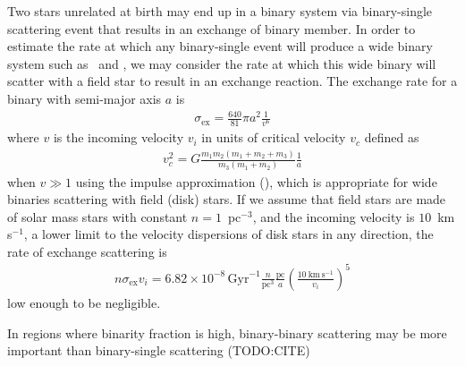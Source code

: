 \documentclass[manuscript]{aastex6}
\newcommand{\sunanalog}{\text{HD 240429}}
\newcommand{\bizarreone}{\text{HD 240430}}
\newcommand{\todo}[1]{{\color{blue}TODO:#1}}
\begin{document}
Two stars unrelated at birth may end up in a binary system via binary-single scattering event
that results in an exchange of binary member.
In order to estimate the rate at which any binary-single
event will produce a wide binary system such as \sunanalog\ and \bizarreone,
we may consider the rate at which this wide binary will scatter with a field star to
result in an exchange reaction.
The exchange rate for a binary with semi-major axis $a$ is
\begin{eqnarray}
  \sigma_\mathrm{ex} = \frac{640}{81} \pi a^{2} \frac{1}{v^6}
\end{eqnarray}
where $v$ is the incoming velocity $v_i$ in units of critical velocity $v_c$ defined as
\begin{eqnarray}
  v_c^2 = G \frac{m_1 m_2 (m_1 + m_2 + m_3)}{m_3 (m_1 + m_2)} \frac{1}{a}
\end{eqnarray}
when $v \gg 1$ using the impulse approximation (\citealt{Hut:1983aa,Hut:1983ab}),
which is appropriate for wide binaries scattering with field (disk) stars.
If we assume that field stars are made of solar mass stars with constant $n=1$~pc$^{-3}$,
and the incoming velocity is $10$~km\,s$^{-1}$, a lower limit to the velocity dispersions of disk
stars in any direction, the rate of exchange scattering is
\begin{eqnarray}
  n \sigma_\mathrm{ex} v_i = 6.82\times 10^{-8}\,\mathrm{Gyr}^{-1}
  \frac{n}{\mathrm{pc}^3} \frac{\mathrm{pc}}{a} \left(\frac{10~\mathrm{km}\,\mathrm{s}^{-1}}{v_i}\right)^5
\end{eqnarray}
low enough to be negligible.

In regions where binarity fraction is high, binary-binary scattering may be more important
than binary-single scattering (\todo{CITE})


\end{document}
